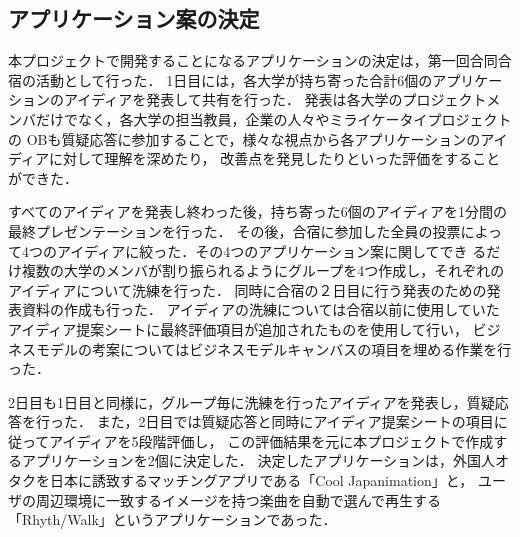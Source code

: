 \subsection{アプリケーション案の決定}

\par
本プロジェクトで開発することになるアプリケーションの決定は，第一回合同合宿の活動として行った．
1日目には，各大学が持ち寄った合計6個のアプリケーションのアイディアを発表して共有を行った．
発表は各大学のプロジェクトメンバだけでなく，各大学の担当教員，企業の人々やミライケータイプロジェクトの
OBも質疑応答に参加することで，様々な視点から各アプリケーションのアイディアに対して理解を深めたり，
改善点を発見したりといった評価をすることができた．

\par
すべてのアイディアを発表し終わった後，持ち寄った6個のアイディアを1分間の最終プレゼンテーションを行った．
その後，合宿に参加した全員の投票によって4つのアイディアに絞った．その4つのアプリケーション案に関してでき
るだけ複数の大学のメンバが割り振られるようにグループを4つ作成し，それぞれのアイディアについて洗練を行った．
同時に合宿の２日目に行う発表のための発表資料の作成も行った．
アイディアの洗練については合宿以前に使用していたアイディア提案シートに最終評価項目が追加されたものを使用して行い，
ビジネスモデルの考案についてはビジネスモデルキャンバスの項目を埋める作業を行った．

\par
2日目も1日目と同様に，グループ毎に洗練を行ったアイディアを発表し，質疑応答を行った．
また，2日目では質疑応答と同時にアイディア提案シートの項目に従ってアイディアを5段階評価し，
この評価結果を元に本プロジェクトで作成するアプリケーションを2個に決定した．
決定したアプリケーションは，外国人オタクを日本に誘致するマッチングアプリである「Cool Japanimation」と，
ユーザの周辺環境に一致するイメージを持つ楽曲を自動で選んで再生する「Rhyth/Walk」というアプリケーションであった．
